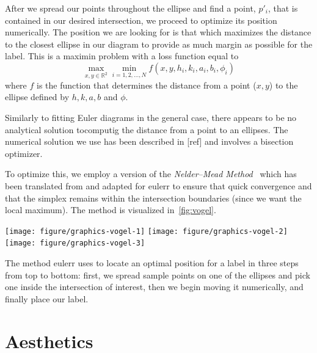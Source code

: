 \documentclass[
  oneside,
  openany,
  numbers=noendperiod,
  parskip=half,
  bibliography=totoc
]{scrbook}\usepackage[]{graphicx}\usepackage{xcolor}
\newenvironment{knitrout}{}{} %
\newcommand{\pkg}[1]{{\fontseries{b}\selectfont #1}}
\begin{document}
After we spread our points throughout the ellipse and find a point, $p'_i$, that
is contained in our desired intersection, we proceed to optimize its position
numerically. The position we are looking for is that which maximizes the
distance to the closest ellipse in our diagram to provide as much margin as
possible for the label. This is a maximin problem with a loss function equal to
\begin{equation}
\max_{x,y \in \mathbb{R}^2} \min_{i=1,2,\dots,N} f(x,y,h_i,k_i,a_i,b_i,\phi_i)
\label{eq:lossDist}
\end{equation}
where $f$ is the function that determines the distance from a point ($x,y$) to the ellipse defined by $h,k,a,b$ and $\phi$.

Similarly to fitting Euler diagrams in the general case, there appears to be no
analytical solution tocomputig the distance from a point to an ellipses. The
numerical solution we use has been described in [ref] and involves a bisection
optimizer.

To optimize this, we employ a version of the
\emph{Nelder--Mead Method}~\citep{nelder_1965} which has been translated from
\citet{kelley_1999} and adapted for \pkg{eulerr} to ensure that quick
convergence and that the simplex remains within the intersection boundaries
(since we want the local maximum). The method is visualized in~\cref{fig:vogel}.
\begin{marginfigure}
\begin{knitrout}\small
{}\color{fgcolor}

{\centering \texttt{[image: figure/graphics-vogel-1]} 
\texttt{[image: figure/graphics-vogel-2]} 
\texttt{[image: figure/graphics-vogel-3]} 

}



\end{knitrout}
\caption{The method eulerr uses to locate an optimal position for a label in
three steps from top to bottom: first, we spread sample points on one of the
ellipses and pick one inside the intersection of interest, then we begin moving
it numerically, and finally place our label.}
\label{fig:vogel}
\end{marginfigure}

\section{Aesthetics}
\label{sec:aesthetics}
\end{document}
